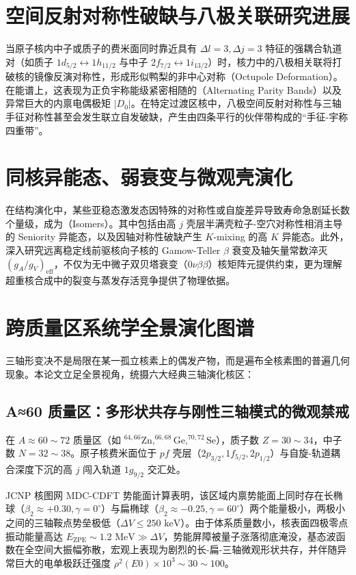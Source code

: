 \section{空间反射对称性破缺与八极关联研究进展}
\label{sec:octupole_correlations_progress}
当原子核内中子或质子的费米面同时靠近具有 $\Delta l = 3, \Delta j = 3$ 特征的强耦合轨道对（如质子 $1d_{5/2} \leftrightarrow 1h_{11/2}$ 与中子 $2f_{7/2} \leftrightarrow 1i_{13/2}$）时，核力中的八极相关联将打破核的镜像反演对称性，形成形似鸭梨的非中心对称（Octupole Deformation）。在能谱上，这表现为正负宇称能级紧密相随的（Alternating Parity Bands）以及异常巨大的内禀电偶极矩 $|D_0|$。在特定过渡区核中，八极空间反射对称性与三轴手征对称性甚至会发生联立自发破缺，产生由四条平行的伙伴带构成的“手征-宇称四重带”。

\section{同核异能态、弱衰变与微观壳演化}
\label{sec:isomers_decay_shell_evolution}
在结构演化中，某些亚稳态激发态因特殊的对称性或自旋差异导致寿命急剧延长数个量级，成为（Isomers）。其中包括由高 $j$ 壳层半满壳粒子-空穴对称性相消主导的 Seniority 异能态，以及因轴对称性破缺产生 $K$-mixing 的高 $K$ 异能态。此外，深入研究远离稳定线前驱核向子核的 Gamow-Teller $\beta$ 衰变及轴矢量常数淬灭 $(g_A/g_V)_{\text{eff}}$，不仅为无中微子双贝塔衰变（$0\nu\beta\beta$）核矩阵元提供约束，更为理解超重核合成中的裂变与蒸发存活竞争提供了物理依据。

\section{跨质量区系统学全景演化图谱}
\label{sec:cross_mass_regions}

三轴形变决不是局限在某一孤立核素上的偶发产物，而是遍布全核素图的普遍几何现象。本论文立足全景视角，统摄六大经典三轴演化核区：

\subsection{A≈60 质量区：多形状共存与刚性三轴模式的微观禁戒}
在 $A \approx 60 \sim 72$ 质量区（如 $^{64,66}\text{Zn}, ^{66,68}\text{Ge}, ^{70,72}\text{Se}$），质子数 $Z = 30 \sim 34$，中子数 $N = 32 \sim 38$。原子核费米面位于 $pf$ 壳层（$2p_{3/2}, 1f_{5/2}, 2p_{1/2}$）与自旋-轨道耦合深度下沉的高 $j$ 闯入轨道 $1g_{9/2}$ 交汇处。

JCNP 核图网 MDC-CDFT 势能面计算表明，该区域内禀势能面上同时存在长椭球（$\beta_2 \approx +0.30, \gamma = 0^\circ$）与扁椭球（$\beta_2 \approx -0.25, \gamma = 60^\circ$）两个能量极小，两极小之间的三轴鞍点势垒极低（$\Delta V \le 250\text{ keV}$）。由于体系质量数小，核表面四极零点振动能量高达 $E_{\text{ZPE}} \sim 1.2\text{ MeV} \gg \Delta V$，势能屏障被量子涨落彻底淹没，基态波函数在全空间大振幅弥散，宏观上表现为剧烈的长-扁-三轴微观形状共存，并伴随异常巨大的电单极跃迁强度 $\rho^2(E0) \times 10^3 \sim 30 \sim 100$。

